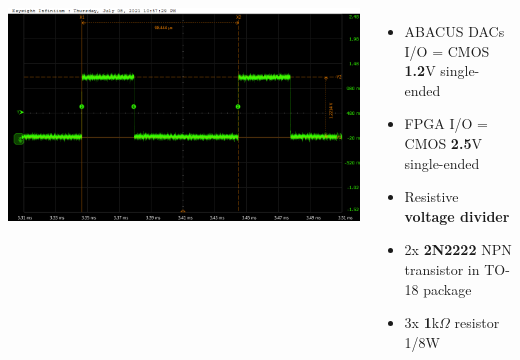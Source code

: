 \documentclass[aspectratio=169]{beamer}
\begin{document}
\begin{frame}
\begin{columns}
\begin{center}
				\includegraphics[width=0.5 \textwidth]{IMG/probe/09-08-2021_clock-specks.png}
			\end{center}
			\begin{itemize}
				\item ABACUS DACs I/O = CMOS \textbf{1.2}V single-ended
				\item FPGA I/O = CMOS \textbf{2.5}V single-ended
				\item Resistive \textbf{voltage divider}
				\item 2x \textbf{2N2222} NPN transistor in TO-18 package
				\item 3x \textbf{1}k$\Omega$ resistor 1/8W
			\end{itemize}
		\end{columns}
	\end{frame}
	
\end{document}
